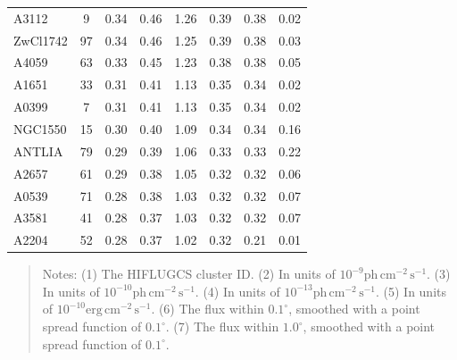 \documentclass[10pt,aps,pra,reprint,amsmath,amsfonts,amssymb,showpacs,nofootinbib,floatfix]{revtex4-1}
\newcommand{\rmn}{\mathrm}
\newcommand{\vstt}{\vspace{-0.0mm}}
\begin{document}
{\begin{table}
\begin{minipage}{2.0\columnwidth}
\begin{tabular}{l c c c c c c c}
A3112    &   9 &   0.34 &   0.46 &   1.26 &   0.39 &   0.38 &   0.02 \vstt \\
ZwCl1742 &  97 &   0.34 &   0.46 &   1.25 &   0.39 &   0.38 &   0.03 \vstt \\
A4059    &  63 &   0.33 &   0.45 &   1.23 &   0.38 &   0.38 &   0.05 \vstt \\
A1651    &  33 &   0.31 &   0.41 &   1.13 &   0.35 &   0.34 &   0.02 \vstt \\
A0399    &   7 &   0.31 &   0.41 &   1.13 &   0.35 &   0.34 &   0.02 \vstt \\
NGC1550  &  15 &   0.30 &   0.40 &   1.09 &   0.34 &   0.34 &   0.16 \vstt \\
ANTLIA   &  79 &   0.29 &   0.39 &   1.06 &   0.33 &   0.33 &   0.22 \vstt \\
A2657    &  61 &   0.29 &   0.38 &   1.05 &   0.32 &   0.32 &   0.06 \vstt \\
A0539    &  71 &   0.28 &   0.38 &   1.03 &   0.32 &   0.32 &   0.07 \vstt \\
A3581    &  41 &   0.28 &   0.37 &   1.03 &   0.32 &   0.32 &   0.07 \vstt \\
A2204    &  52 &   0.28 &   0.37 &   1.02 &   0.32 &   0.21 &   0.01 \vstt \\
\hline
\hline
\end{tabular}
\begin{quote}
  Notes:
   (1) The HIFLUGCS cluster ID.
   (2) In units of $10^{-9} \rmn{ph}\,\rmn{cm}^{-2}\,\rmn{s}^{-1}$.
   (3) In units of $10^{-10} \rmn{ph}\,\rmn{cm}^{-2}\,\rmn{s}^{-1}$.
   (4) In units of $10^{-13} \rmn{ph}\,\rmn{cm}^{-2}\,\rmn{s}^{-1}$.
   (5) In units of $10^{-10} \rmn{erg}\,\rmn{cm}^{-2}\,\rmn{s}^{-1}$.
   (6) The flux within $0.1^\circ$, smoothed with a point spread function of $0.1^\circ$.
   (7) The flux within $1.0^\circ$, smoothed with a point spread function of $0.1^\circ$.
 \label{tab:flux_tab_CRs}
  \end{quote}
\end{minipage}
\end{table}

}
\end{document}
